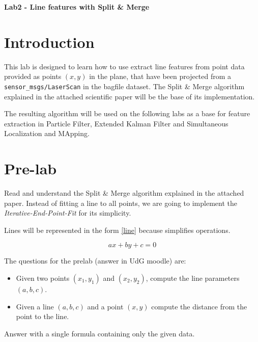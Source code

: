 \documentclass[a4paper,10pt]{article}
\begin{document}
\marginsize{2cm}{2cm}{2cm}{2cm}

\begin{center}
\Large \textbf{Lab2 - Line features with Split \& Merge}
\end{center}

\section{Introduction}

This lab is designed to learn how to use extract line features from point data provided as points $(x,y)$ in the plane, that have been projected from a \texttt{sensor\_msgs/LaserScan} in the bagfile dataset. The Split \& Merge algorithm explained in the attached scientific paper will be the base of its implementation.

The resulting algorithm will be used on the following labs as a base for feature extraction in Particle Filter, Extended Kalman Filter and Simultaneous Localization and MApping. 

\section{Pre-lab}

Read and understand the Split \& Merge algorithm explained in the attached paper. Instead of fitting a line to all points, we are going to implement the \emph{Iterative-End-Point-Fit} for its simplicity.

Lines will be represented in the form \eqref{line} because simplifies operations.

\begin{equation}
    a x + b y + c = 0 \label{line}
\end{equation}

\noindent
The questions for the prelab (answer in UdG moodle) are:

\begin{itemize}
    \item Given two points $(x_1, y_1)$ and $(x_2, y_2)$, compute the line parameters $(a,b,c)$.
    \item Given a line $(a,b,c)$ and a point $(x,y)$ compute the distance from the point to the line.
\end{itemize}

\noindent
Answer with a single formula containing only the given data.
\end{document}
